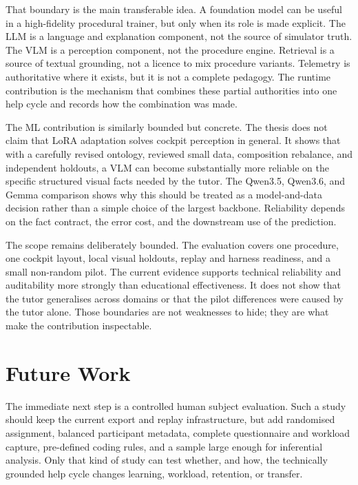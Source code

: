 That boundary is the main transferable idea. A foundation model can be useful
in a high-fidelity procedural trainer, but only when its role is made explicit.
The LLM is a language and explanation component, not the source of simulator
truth. The VLM is a perception component, not the procedure engine. Retrieval
is a source of textual grounding, not a licence to mix procedure variants.
Telemetry is authoritative where it exists, but it is not a complete pedagogy.
The runtime contribution is the mechanism that combines these partial
authorities into one help cycle and records how the combination was made.

The ML contribution is similarly bounded but concrete. The thesis does not
claim that LoRA adaptation solves cockpit perception in general. It shows that
with a carefully revised ontology, reviewed small data, composition rebalance,
and independent holdouts, a VLM can become substantially more reliable on the
specific structured visual facts needed by the tutor. The Qwen3.5, Qwen3.6, and
Gemma comparison shows why this should be treated as a model-and-data decision
rather than a simple choice of the largest backbone. Reliability depends on the
fact contract, the error cost, and the downstream use of the prediction.

The scope remains deliberately bounded. The evaluation covers one procedure,
one cockpit layout, local visual holdouts, replay and harness readiness, and a
small non-random pilot. The current evidence supports technical reliability and
auditability more strongly than educational effectiveness. It does not show that
the tutor generalises across domains or that the pilot differences were caused
by the tutor alone. Those boundaries are not weaknesses to hide; they are what
make the contribution inspectable.

\section{Future Work}\label{sec:conc-future}

The immediate next step is a controlled human subject evaluation. Such a study
should keep the current export and replay infrastructure, but add randomised
assignment, balanced participant metadata, complete questionnaire and workload
capture, pre-defined coding rules, and a sample large enough for inferential
analysis. Only that kind of study can test whether, and how, the technically
grounded help cycle changes learning, workload, retention, or transfer.


